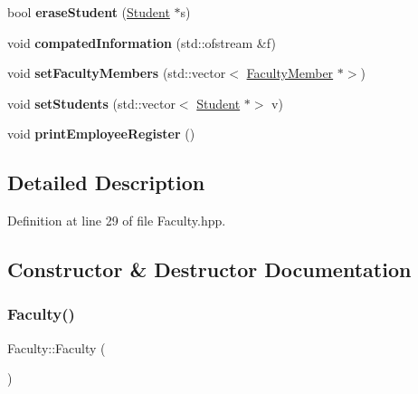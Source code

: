 \begin{DoxyCompactItemize}
\mbox{\label{classFaculty_a3e14c00fa37ab25585a549f3037f0fa9}} 
bool {\bfseries erase\+Student} (\hyperlink{classStudent}{Student} $\ast$s)
\item 
\mbox{\label{classFaculty_ad4f56ad6717168df8edcda0175b41827}} 
void {\bfseries compated\+Information} (std\+::ofstream \&f)
\item 
\mbox{\label{classFaculty_a3f0c44c19921eeba6677dcefc45e8d20}} 
void {\bfseries set\+Faculty\+Members} (std\+::vector$<$ \hyperlink{classFacultyMember}{Faculty\+Member} $\ast$$>$)
\item 
\mbox{\label{classFaculty_adcb450152b935deb3d1a7fecf741b7b8}} 
void {\bfseries set\+Students} (std\+::vector$<$ \hyperlink{classStudent}{Student} $\ast$$>$ v)
\item 
\mbox{\label{classFaculty_abc4b87bd3404b95815faf1b552c629e9}} 
void {\bfseries print\+Employee\+Register} ()
\end{DoxyCompactItemize}


\subsection{Detailed Description}


Definition at line 29 of file Faculty.\+hpp.



\subsection{Constructor \& Destructor Documentation}
\mbox{\label{classFaculty_a1c3f6a0eefcd4aee451e8c1db8e658fc}} 
\subsubsection{\texorpdfstring{Faculty()}{Faculty()}\hspace{0.1cm}{\footnotesize\ttfamily [1/2]}}
{\footnotesize\ttfamily Faculty\+::\+Faculty (\begin{DoxyParamCaption}{ }\end{DoxyParamCaption})}

